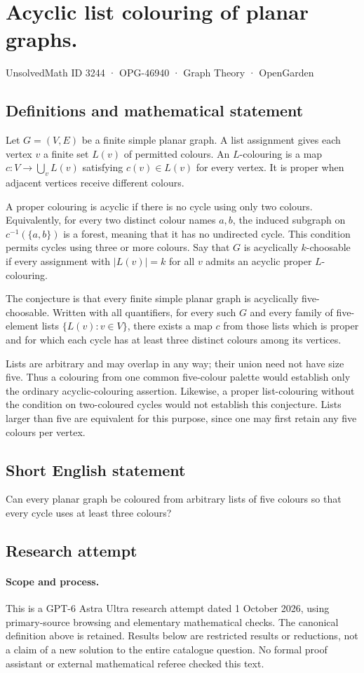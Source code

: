 \documentclass[11pt,a4paper]{article}
\begin{document}
\section*{Acyclic list colouring of planar graphs.}\label{3244}
{\small UnsolvedMath ID 3244 · OPG-46940 · Graph Theory · OpenGarden}
\subsection{Definitions and mathematical statement}
Let $G=(V,E)$ be a finite simple planar graph. A list assignment gives each
vertex $v$ a finite set $L(v)$ of permitted colours. An $L$-colouring is a
map $c:V\to\bigcup_vL(v)$ satisfying $c(v)\in L(v)$ for every vertex.
It is proper when adjacent vertices receive different colours.

A proper colouring is acyclic if there is no cycle using only two colours.
Equivalently, for every two distinct colour names $a,b$, the induced
subgraph on $c^{-1}(\{a,b\})$ is a forest, meaning that it has no
undirected cycle. This condition permits cycles using three or more
colours. Say that $G$ is acyclically $k$-choosable if every assignment with
$|L(v)|=k$ for all $v$ admits an acyclic proper $L$-colouring.

The conjecture is that every finite simple planar graph is acyclically
five-choosable. Written with all quantifiers, for every such $G$ and every
family of five-element lists $\{L(v):v\in V\}$, there exists a map $c$
from those lists which is proper and for which each cycle has at least
three distinct colours among its vertices.

Lists are arbitrary and may overlap in any way; their union need not
have size five. Thus a colouring from one common five-colour palette
would establish only the ordinary acyclic-colouring assertion. Likewise,
a proper list-colouring without the condition on two-coloured cycles
would not establish this conjecture. Lists larger than five are equivalent
for this purpose, since one may first retain any five colours per vertex.
\subsection{Short English statement}
Can every planar graph be coloured from arbitrary lists of five colours so that every cycle uses at least three colours?
\subsection{Research attempt}
\paragraph{Scope and process.}
This is a GPT-6 Astra Ultra research attempt dated 1 October 2026, using
primary-source browsing and elementary mathematical checks. The canonical
definition above is retained. Results below are restricted results or
reductions, not a claim of a new solution to the entire catalogue question.
No formal proof assistant or external mathematical referee checked this text.
\end{document}

